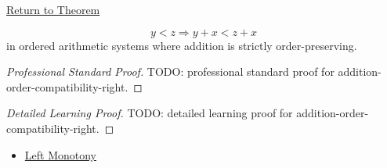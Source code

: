 \newpage
{}
\label{prf:addition-order-compatibility-right}

\begin{remark*}[Return]
\hyperref[prop:addition-order-compatibility-right]{Return to Theorem}
\end{remark*}

\begin{proposition*}
\[
y<z \Longrightarrow y+x<z+x
\]
in ordered arithmetic systems where addition is strictly order-preserving.
\end{proposition*}

\begin{proof}[Professional Standard Proof]
\LRAProofBodyStart
TODO: professional standard proof for addition-order-compatibility-right.
\end{proof}

\begin{proof}[Detailed Learning Proof]
\LRAProofBodyStart
TODO: detailed learning proof for addition-order-compatibility-right.
\end{proof}

\begin{remark*}
\end{remark*}

\begin{dependencies}
\begin{itemize}
  \item \hyperref[def:left-monotony]{Left Monotony}
\end{itemize}
\end{dependencies}

\clearpage
